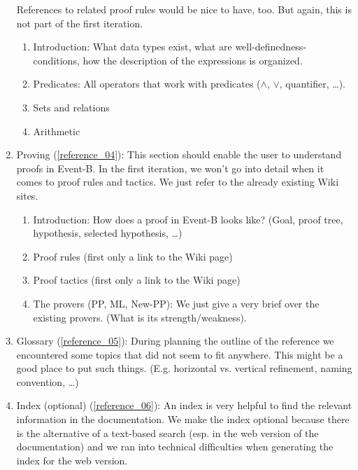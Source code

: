 \begin{enumerate}
  References to related proof rules would be nice to have, too. But again, this is not part of the first iteration.
  \begin{enumerate}
  \item Introduction: What data types exist, what are well-definedness-conditions, 
    how the description of the expressions is organized.
  \item Predicates: All operators that work with predicates ($\land$, $\lor$, quantifier, \ldots). 
  \item Sets and relations
  \item Arithmetic
  \end{enumerate}
\item Proving (\ref{reference_04}): This section should enable the user to understand proofs in Event-B.
  In the first iteration, we won't go into detail when it comes to proof rules and tactics. We
  just refer to the already existing Wiki sites.
  \begin{enumerate}
  \item Introduction: How does a proof in Event-B looks like? (Goal, proof tree, hypothesis, selected hypothesis, \ldots)
  \item Proof rules (first only a link to the Wiki page)
  \item Proof tactics (first only a link to the Wiki page)
  \item The provers (PP, ML, New-PP): We just give a very brief over the existing provers.
    (What is its strength/weakness).
  \end{enumerate}
\item Glossary (\ref{reference_05}):
  During planning the outline of the reference we encountered some
  topics that did not seem to fit anywhere. This might be a good place
  to put such things.
  (E.g. horizontal vs. vertical refinement, naming convention, \ldots)
\item Index (optional) (\ref{reference_06}):
  An index is very helpful to find the relevant information in the documentation.
  We make the index optional because there is the alternative of a text-based search (esp. in the
  web version of the documentation) and we ran into technical difficulties when generating the 
  index for the web version.
\end{enumerate}

